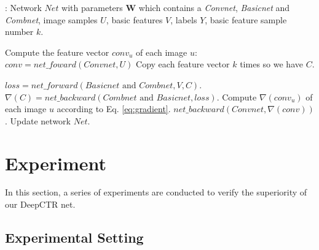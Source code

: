 \documentclass{sig-alternate}
\begin{document}
\begin{algorithm}[tb]
	\caption{$forward\_backward$}
	\label{alg:fb}
	\begin{algorithmic}[1]
		\renewcommand{\algorithmicrequire}{\textbf{Input:}}
		\renewcommand{\algorithmicensure}{\textbf{Output:}}
		\Require: Network $Net$ with parameters $\mathbf{W}$ which contains a \emph{Convnet}, \emph{Basicnet} and \emph{Combnet}, image samples $U$, basic features $V$, labels $Y$, basic feature sample number $k$. 
		
		
		
		\State Compute the feature vector $conv_{u}$ of each image $u$:
		$
		conv = net\_foward(Convnet, U)
		$
		\State Copy each feature vector $k$ times so we have $C$.
		
		\State  $loss = net\_forward(Basicnet \text{ and } Combnet, V, C)$.
		\State  $\nabla(C) = net\_backward(Combnet \text{ and } Basicnet, loss)$.
		\State Compute $\nabla(conv_{u})$ of each image $u$ according to Eq. \ref{eq:gradient}.
		\State $net\_backward(Convnet, \nabla(conv))$.
		\State Update network $Net$.
	\end{algorithmic}
\end{algorithm}  
\section{Experiment}
In this section, a series of experiments are conducted to verify the superiority of our DeepCTR net.
\subsection{Experimental Setting}
\end{document}
